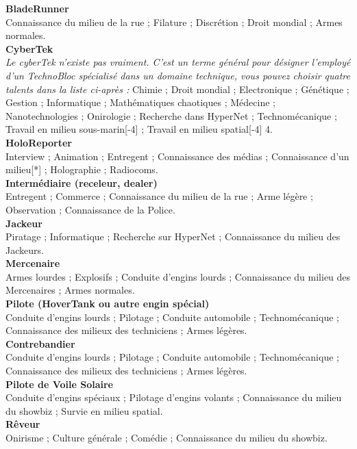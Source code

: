 \documentclass[11pt,twoside,a4paper]{article}
\begin{document}
\begin{multicols*}{2}
{\footnotesize %
\textbf{BladeRunner}~\\
Connaissance du milieu de la rue ; Filature ; Discr{\'e}tion ; Droit mondial ; Armes normales. ~\\
\textbf{CyberTek}~\\
\emph{Le cyberTek n'existe pas vraiment. C'est un terme g{\'e}n{\'e}ral pour d{\'e}signer l'employ{\'e} d'un TechnoBloc sp{\'e}cialis{\'e} dans un domaine technique, vous pouvez choisir quatre talents dans la liste ci-apr{\`e}s : } Chimie ; Droit mondial ; Electronique ; G{\'e}n{\'e}tique ; Gestion ; Informatique ; Math{\'e}matiques chaotiques ; M{\'e}decine ; Nanotechnologies ; Onirologie ; Recherche dans HyperNet ; Technom{\'e}canique ; Travail en milieu sous-marin[-4] ; Travail en milieu spatial[-4]	4. ~\\
\textbf{HoloReporter}~\\
Interview ; Animation ; Entregent ; Connaissance des m{\'e}dias ; Connaissance d'un milieu[*] ; Holographie ; Radiocoms. ~\\
\textbf{Interm{\'e}diaire (receleur, dealer)}~\\
Entregent ; Commerce ; Connaissance du milieu de la rue ; Arme l{\'e}g{\`e}re ; Observation ; Connaissance de la Police. ~\\
\textbf{Jackeur}~\\
Piratage ; Informatique ; Recherche sur HyperNet ; Connaissance du milieu des Jackeurs. ~\\
\textbf{Mercenaire}~\\
Armes lourdes ; Explosifs ; Conduite d'engins lourds ; Connaissance du milieu des Mercenaires ; Armes normales. ~\\
\textbf{Pilote (HoverTank ou autre engin sp{\'e}cial)}~\\
Conduite d'engins lourds ; Pilotage ; Conduite automobile ; Technom{\'e}canique ; Connaissance des milieux des techniciens ; Armes l{\'e}g{\`e}res. ~\\
\textbf{Contrebandier}~\\
Conduite d'engins lourds ; Pilotage ; Conduite automobile ; Technom{\'e}canique ; Connaissance des milieux des techniciens ; Armes l{\'e}g{\`e}res. ~\\
\textbf{Pilote de Voile Solaire}~\\
Conduite d'engins sp{\'e}ciaux ; Pilotage d'engins volants ; Connaissance du milieu du showbiz ; Survie en milieu spatial. ~\\
\textbf{R{\^e}veur}~\\
Onirisme ; Culture g{\'e}n{\'e}rale ; Com{\'e}die ; Connaissance du milieu du showbiz. ~\\
}
\end{multicols*}
\end{document}
